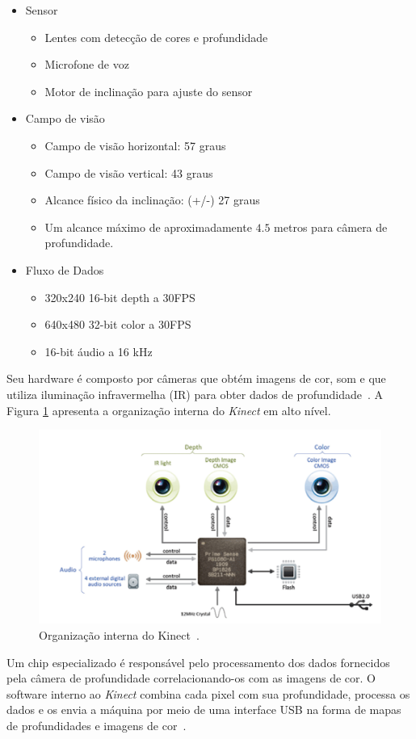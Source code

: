 	\begin{itemize}
		\item Sensor
			\begin{itemize}
				\item Lentes com detecção de cores e profundidade
				\item Microfone de voz
				\item Motor de inclinação para ajuste do sensor
			\end{itemize}
		\item Campo de visão
			\begin{itemize}
				\item Campo de visão horizontal: 57 graus
				\item Campo de visão vertical: 43 graus
				\item Alcance físico da inclinação: (+/-) 27 graus
				\item Um alcance máximo de aproximadamente $\displaystyle 4.5$ metros para câmera de profundidade. 
			\end{itemize}
		\item Fluxo de Dados
			\begin{itemize}
				\item 320x240 16-bit depth a 30FPS
				\item 640x480 32-bit color a 30FPS
				\item 16-bit áudio a 16 kHz
			\end{itemize}
	\end{itemize}

Seu hardware é composto por câmeras que obtém imagens de cor, som e que utiliza iluminação infravermelha (IR) para obter dados de profundidade~\cite{kinect}. A Figura \ref{kinect_interno} apresenta a organização interna do \textit{Kinect} em alto nível.

	\begin{figure}[hbt]
		\begin{center}
			\includegraphics[scale=0.8]{figuras/2.FundamentacaoTeorica/kinect_interno.png}
		\end{center}
		\caption{Organização interna do Kinect~\cite{kinect}.}
		\label{kinect_interno}
	\end{figure}

Um chip especializado é responsável pelo processamento dos dados fornecidos pela câmera de profundidade correlacionando-os com as imagens de cor. O software interno ao \textit{Kinect} combina cada pixel com sua profundidade, processa os dados e os envia a máquina por meio de uma interface USB na forma de mapas de profundidades e imagens de cor~\cite{kinect}.

